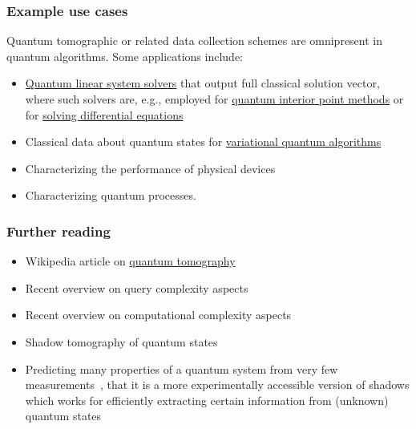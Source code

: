 \begin{refsection}

\subsubsection*{Example use cases}

Quantum tomographic or related data collection schemes are omnipresent in quantum algorithms. Some applications include:
\begin{itemize}
    \item \hyperref[prim:QuantumLinearSystemSolvers]{Quantum linear system solvers} that output full classical solution vector, where such solvers are, e.g., employed for \hyperref[prim:QIPM]{quantum interior point methods} or for \hyperref[appl:DiffEq]{solving differential equations}
    \item Classical data about quantum states for \hyperref[prim:VQA]{variational quantum algorithms}
    \item Characterizing the performance of physical devices
    \item Characterizing quantum processes.
\end{itemize}


\subsubsection*{Further reading}

\begin{itemize}
    \item Wikipedia article on \href{https://en.wikipedia.org/wiki/Quantum_tomography}{quantum tomography}
    \item Recent overview on query complexity aspects~\cite{apeldoorn2022TomographyStatePreparationUnitaries}
    \item Recent overview on computational complexity aspects~\cite{lowe2022lowerboundquantumtomo}
    \item Shadow tomography of quantum states~\cite{aaronson2018ShadowTomography}
    \item Predicting many properties of a quantum system from very few measurements~\cite{huang2020predicitingmanypropfewmeas}, that it is a more experimentally accessible version of shadows which works for efficiently extracting certain information from (unknown) quantum states
\end{itemize}

\printbibliography[heading=secbib,segment=\therefsegment]

\end{refsection}
